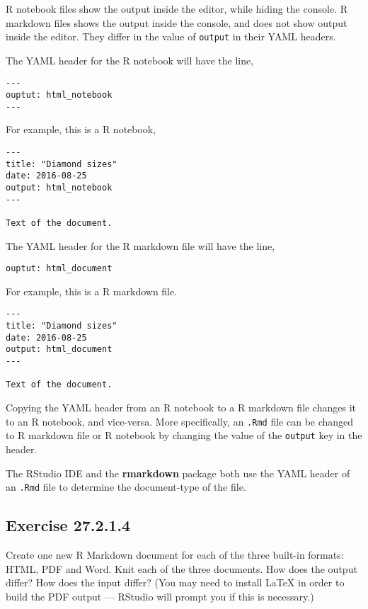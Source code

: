 \documentclass[]{book}
\theoremstyle{plain}
\theoremstyle{remark}
\begin{document}
R notebook files show the output inside the editor, while hiding the
console. R markdown files shows the output inside the console, and does
not show output inside the editor. They differ in the value of
\texttt{output} in their YAML headers.

The YAML header for the R notebook will have the line,

\begin{verbatim}
---
ouptut: html_notebook
---
\end{verbatim}

For example, this is a R notebook,

\begin{verbatim}
---
title: "Diamond sizes"
date: 2016-08-25
output: html_notebook
---

Text of the document.
\end{verbatim}

The YAML header for the R markdown file will have the line,

\begin{verbatim}
ouptut: html_document
\end{verbatim}

For example, this is a R markdown file.

\begin{verbatim}
---
title: "Diamond sizes"
date: 2016-08-25
output: html_document
---

Text of the document.
\end{verbatim}

Copying the YAML header from an R notebook to a R markdown file changes
it to an R notebook, and vice-versa. More specifically, an \texttt{.Rmd}
file can be changed to R markdown file or R notebook by changing the
value of the \texttt{output} key in the header.

The RStudio IDE and the \textbf{rmarkdown} package both use the YAML
header of an \texttt{.Rmd} file to determine the document-type of the
file.

\hypertarget{exercise-27.2.1.4}{%
\subsection*{\texorpdfstring{Exercise
{27.2.1.4}}{Exercise 27.2.1.4}}\label{exercise-27.2.1.4}}

Create one new R Markdown document for each of the three built-in
formats: HTML, PDF and Word. Knit each of the three documents. How does
the output differ? How does the input differ? (You may need to install
LaTeX in order to build the PDF output --- RStudio will prompt you if
this is necessary.)
\end{document}
